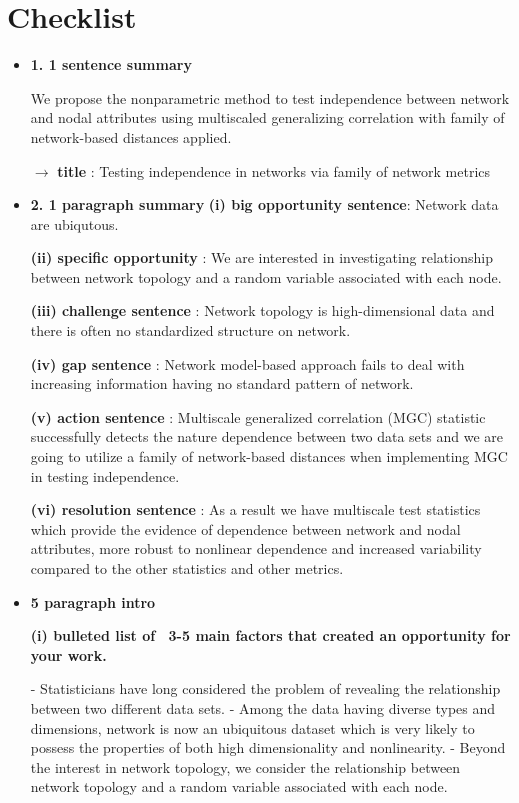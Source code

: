 \documentclass[12pt]{article}
\begin{document}
\section{Checklist}

\begin{itemize}

\item \textbf{1.  1 sentence summary}

We propose the nonparametric method to test independence between network and nodal attributes using multiscaled generalizing correlation with family of network-based distances applied.

$\rightarrow$ \textbf{title} : Testing independence in networks via family of network metrics


\item \textbf{2.  1 paragraph summary} 
\subitem \textbf{(i) big opportunity sentence}: Network data are ubiqutous.

\subitem \textbf{(ii) specific opportunity} : We are interested in investigating relationship between network topology and a random variable associated with each node.

\subitem \textbf{(iii) challenge sentence} : Network topology is high-dimensional data and there is often no standardized structure on network.

\subitem \textbf{(iv) gap sentence} : Network model-based approach fails to deal with increasing information having no standard pattern of network.

\subitem \textbf{(v)  action sentence} : Multiscale generalized correlation (MGC) statistic successfully detects the nature dependence between two data sets and we are going to utilize a family of network-based distances when implementing MGC in testing independence.

\subitem \textbf{(vi) resolution sentence} : As a result we have multiscale test statistics which provide the evidence of dependence between network and nodal attributes, more robust to nonlinear dependence and increased variability compared to the other statistics and other metrics.


\item \textbf{5 paragraph intro}

\subitem \textbf{(i) bulleted list of ~3-5 main factors that created an opportunity for your work.}

\subsubitem - Statisticians have long considered the problem of revealing the relationship between two different data sets.
\subsubitem - Among the data having diverse types and dimensions, network is now an ubiquitous dataset which is very likely to possess the properties of both high dimensionality and nonlinearity.
\subsubitem - Beyond the interest in network topology, we consider the relationship between network topology and a random variable associated with each node. 


\end{itemize}
\end{document}
